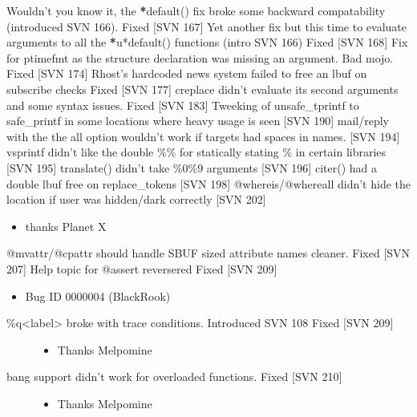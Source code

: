 \documentclass[letterpaper,10pt,english]{sphinxmanual}
\begin{document}
\sphinxAtStartPar
Wouldn’t you know it, the {\color{red}\bfseries{}*}default() fix broke some backward compatability (introduced SVN 166).  Fixed {[}SVN 167{]}
Yet another fix but this time to evaluate arguments to all the {\color{red}\bfseries{}*}u*default() functions (intro SVN 166) Fixed {[}SVN 168{]}
Fix for ptimefmt as the structure declaration was missing an argument.  Bad mojo. \sphinxhyphen{} Fixed {[}SVN 174{]}
Rhost’s hardcoded news system failed to free an lbuf on subscribe checks \sphinxhyphen{} Fixed {[}SVN 177{]}
creplace didn’t evaluate its second arguments and some syntax issues. \sphinxhyphen{} Fixed {[}SVN 183{]}
Tweeking of unsafe\_tprintf to safe\_printf in some locations where heavy usage is seen {[}SVN 190{]}
mail/reply with the the all option wouldn’t work if targets had spaces in names. {[}SVN 194{]}
vsprintf didn’t like the double \%\% for statically stating \% in certain libraries {[}SVN 195{]}
translate() didn’t take \%0\sphinxhyphen{}\%9 arguments {[}SVN 196{]}
citer() had a double lbuf free on replace\_tokens {[}SVN 198{]}
@whereis/@whereall didn’t hide the location if user was hidden/dark correctly {[}SVN 202{]}
\begin{itemize}
\item {} 
\sphinxAtStartPar
thanks Planet X

\end{itemize}

\sphinxAtStartPar
@mvattr/@cpattr should handle SBUF sized attribute names cleaner. \sphinxhyphen{} Fixed {[}SVN 207{]}
Help topic for @assert reversered \sphinxhyphen{} Fixed {[}SVN 209{]}
\begin{itemize}
\item {} 
\sphinxAtStartPar
Bug ID 0000004 (BlackRook)

\end{itemize}
\begin{description}
\item[{\%q\textless{}label\textgreater{} broke with trace conditions.  Introduced SVN 108 \sphinxhyphen{} Fixed {[}SVN 209{]}}] \leavevmode\begin{itemize}
\item {} 
\sphinxAtStartPar
Thanks Melpomine

\end{itemize}

\item[{bang support didn’t work for overloaded functions.  Fixed {[}SVN 210{]}}] \leavevmode\begin{itemize}
\item {} 
\sphinxAtStartPar
Thanks Melpomine

\end{itemize}

\end{description}
\end{document}
